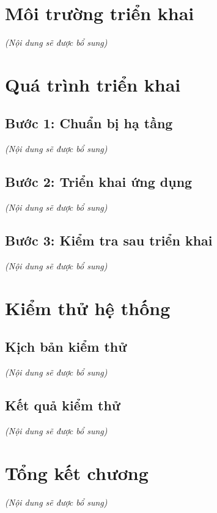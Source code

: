 \section{Môi trường triển khai}
\textit{(Nội dung sẽ được bổ sung)}

\section{Quá trình triển khai}
\subsection{Bước 1: Chuẩn bị hạ tầng}
\textit{(Nội dung sẽ được bổ sung)}

\subsection{Bước 2: Triển khai ứng dụng}
\textit{(Nội dung sẽ được bổ sung)}

\subsection{Bước 3: Kiểm tra sau triển khai}
\textit{(Nội dung sẽ được bổ sung)}

\section{Kiểm thử hệ thống}
\subsection{Kịch bản kiểm thử}
\textit{(Nội dung sẽ được bổ sung)}

\subsection{Kết quả kiểm thử}
\textit{(Nội dung sẽ được bổ sung)}

\section{Tổng kết chương}
\textit{(Nội dung sẽ được bổ sung)}
